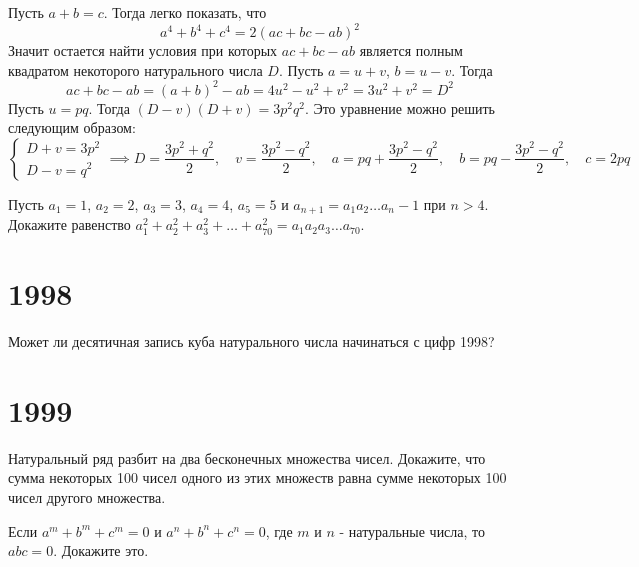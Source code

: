 \documentclass[11pt, a4paper]{problems_template}
\begin{document}
\begin{Solution}
Пусть $a + b = c$. Тогда легко показать, что
$$
a^{4} + b^{4} + c^{4} = 2(ac + bc - ab)^{2}
$$
Значит остается найти условия при которых $ac + bc - ab$ является полным квадратом некоторого натурального числа $D$. Пусть $a = u + v$, $b = u - v$. Тогда
$$
ac + bc - ab = (a + b)^{2} - ab = 4u^{2} - u^{2} + v^{2} = 3u^{2} + v^{2} = D^{2}
$$
Пусть $u = pq$. Тогда $(D - v)(D + v) = 3p^{2}q^{2}$. Это уравнение можно решить следующим образом:
$$
\begin{cases}
D + v = 3p^{2}\\
D - v = q^{2}
\end{cases} \implies D = \frac{3p^{2} + q^{2}}{2}, \quad v = \frac{3p^{2} - q^{2}}{2}, \quad a = pq + \frac{3p^{2} - q^{2}}{2}, \quad b = pq - \frac{3p^{2} - q^{2}}{2},\quad c = 2pq
$$
\end{Solution}

\begin{exercise}[1523]
Пусть $a_{1} = 1$, $a_{2} = 2$, $a_{3} = 3$, $a_{4} = 4$, $a_{5} = 5$ и $a_{n+1} = a_{1}a_{2} \dots a_{n} - 1$ при $n > 4$. Докажите равенство $a_{1}^{2} + a_{2}^{2} + a_{3}^{2} + \dots + a_{70}^{2} = a_{1} a_{2} a_{3} \dots a_{70}$.
\end{exercise}


\chapter{1998}

\begin{exercise}[1662]
Может ли десятичная запись куба натурального числа начинаться с цифр 1998?
\end{exercise}

\chapter{1999}

\begin{exercise}[1667]
Натуральный ряд разбит на два бесконечных множества чисел. Докажите, что сумма некоторых 100 чисел одного из этих множеств равна сумме некоторых 100 чисел другого множества.
\end{exercise}

\begin{exercise}[1703]
Если $a^{m} + b^{m} + c^{m} = 0$ и $a^{n} + b^{n} + c^{n} = 0$, где $m$ и $n$ - натуральные числа, то $abc = 0$. Докажите это.
\end{exercise}
\end{document}
